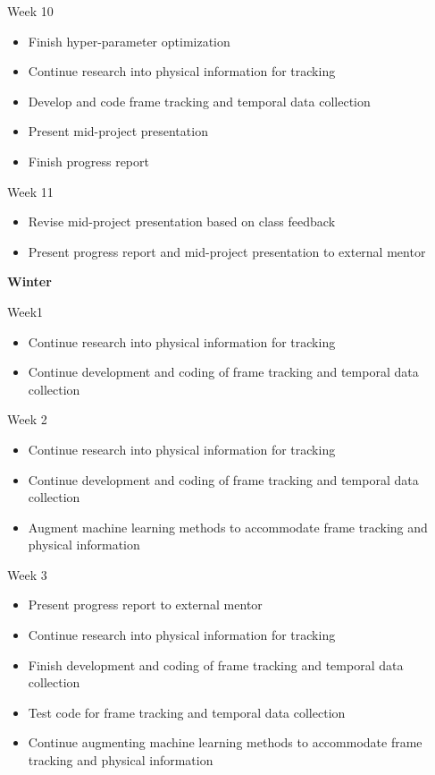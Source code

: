 \documentclass[12pt]{amsart}
\begin{document}
Week 10
\vspace*{-11pt}
\begin{itemize}
	\item Finish hyper-parameter optimization
	\item Continue research into physical information for tracking
	\item Develop and code frame tracking and temporal data collection
	\item Present mid-project presentation 
	\item Finish progress report
\end{itemize}

Week 11
\vspace*{-11pt}
\begin{itemize}
	\item Revise mid-project presentation based on class feedback
	\item Present progress report and mid-project presentation to external mentor
\end{itemize}

\begin{center}
\textbf{Winter}
\end{center}

Week1
\vspace*{-11pt}
\begin{itemize}
	\item Continue research into physical information for tracking
	\item Continue development and coding of frame tracking and temporal data collection
\end{itemize}

Week 2
\vspace*{-11pt}
\begin{itemize}
	\item Continue research into physical information for tracking
	\item Continue development and coding of frame tracking and temporal data collection
	\item Augment machine learning methods to accommodate frame tracking and physical information
\end{itemize}

Week 3
\vspace*{-11pt}
\begin{itemize}
	\item Present progress report to external mentor
	\item Continue research into physical information for tracking
	\item Finish development and coding of frame tracking and temporal data collection
	\item Test code for frame tracking and temporal data collection
	\item Continue augmenting machine learning methods to accommodate frame tracking and physical information
\end{itemize}
\end{document}
